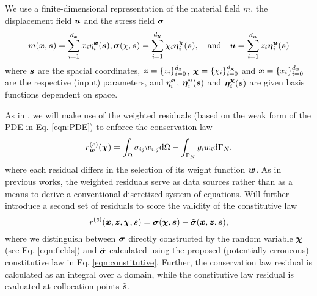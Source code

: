 We use a finite-dimensional representation of the material field $m$, the displacement field $\boldsymbol{u}$ and the stress field $\boldsymbol{\sigma}$
\begin{equation}
    m(\x, \s) = \sum_{i=1}^{d_{\x}} x_i \eta^{\x}_i(\s), \sig(\chi, \s) = \sum_{i=1}^{d_{\ve \chi}} \chi_i \ve{\eta}^{\ve \chi}_i(\s), \quad \mathrm{and} \quad \uv = \sum_{i=1}^{d_{\uv}} z_i \ve{\eta}^{\uv}_i(\s) \label{eqn:fields} %
\end{equation}
where $\boldsymbol{s}$ are the spacial coordinates, $\boldsymbol{z} = \{ z_i \}_{i=0}^{d_{\boldsymbol{z}}}$, $\boldsymbol{\chi} = \{ \chi_i \}_{i=0}^{d_{\boldsymbol{\chi}}}$ and $\boldsymbol{x} = \{ x_i \}_{i=0}^{d_{\boldsymbol{x}}}$ are the respective (input) parameters, 
and $\eta^{\boldsymbol{x}}_i$, $\boldsymbol{\eta}^{\boldsymbol{u}}_i(\boldsymbol{s})$ and $\boldsymbol{\eta}^{\boldsymbol{\chi}}_i(\boldsymbol{s})$ are given basis functions dependent on space.

As in \cite{scholz2025weak}, we will make use of the weighted residuals (based on the weak form of the PDE in Eq. \ref{eqn:PDE}) to enforce the conservation law
\begin{equation}
    \re_{\ve w}(\ve \chi) = \int_{\Omega} \sigma_{ij} w_{i,j} \diff\Omega - \int_{\Gamma_N}  g_i w_i \diff\Gamma_N, \label{eqn:rc} %
\end{equation}
where each residual differs in the selection of its weight function $\boldsymbol{w}$. As in previous works, the weighted residuals serve as data sources rather than as a means to derive a conventional discretized system of equations. Will further introduce a second set of residuals to score the validity of the constitutive law 
\begin{equation}
    r^{(c)}(\boldsymbol{x}, \boldsymbol{z},\boldsymbol{\chi}, \boldsymbol{s}) = \boldsymbol{\sigma}(\boldsymbol{\chi}, \boldsymbol{s}) - \tilde{\boldsymbol{\sigma}}(\boldsymbol{x}, \boldsymbol{z}, \boldsymbol{s}),
\end{equation}
where we distinguish between $\boldsymbol{\sigma}$ directly constructed by the random variable $\boldsymbol{\chi}$ (see Eq. \ref{eqn:fields}) and $\tilde{\boldsymbol{\sigma}}$ calculated using the proposed (potentially erroneous) constitutive law in Eq. \ref{eqn:constitutive}. Further, the conservation law residual is calculated as an integral over a domain, while the constitutive law residual is evaluated at collocation points $\tilde{\boldsymbol{s}}$.

